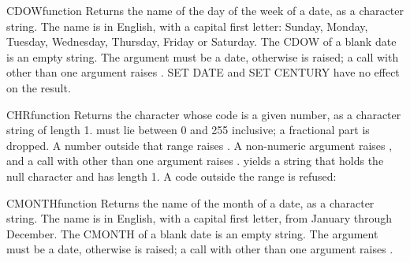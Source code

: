 \begin{XbaseEntry}{CDOW}{function}
Returns the name of the day of the week of a date, as a character string.
\Syntax
{}
\Usage
The name is in English, with a capital first letter: Sunday, Monday, Tuesday, Wednesday, Thursday, Friday or Saturday. The CDOW of a blank date is an empty string. The argument must be a date, otherwise  is raised; a call with other than one argument raises . SET DATE and SET CENTURY have no effect on the result.
\Examples
{}
\end{XbaseEntry}

\begin{XbaseEntry}{CHR}{function}
Returns the character whose code is a given number, as a character string of length 1.
\Syntax
{}
\Usage
{} must lie between 0 and 255 inclusive; a fractional part is dropped. A number outside that range raises . A non-numeric argument raises , and a call with other than one argument raises .  yields a string that holds the null character and has length 1.
\Examples
{}
A code outside the range is refused:
\end{XbaseEntry}

\begin{XbaseEntry}{CMONTH}{function}
Returns the name of the month of a date, as a character string.
\Syntax
{}
\Usage
The name is in English, with a capital first letter, from January through December. The CMONTH of a blank date is an empty string. The argument must be a date, otherwise  is raised; a call with other than one argument raises .
\Examples
{}
\end{XbaseEntry}

